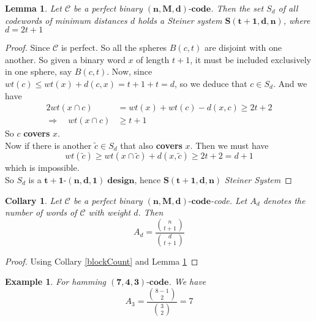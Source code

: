 \documentclass{article}
\newtheorem{lemma}[theorem]{Lemma}
\newtheorem{example}[theorem]{Example}
\newtheorem{collary}[theorem]{Collary}
\numberwithin{equation}{theorem}
\newcommand{\tParamDesign}[4]{\ensuremath{\bm{#1\mbox{-}(#2,#3,#4)\; design}}}
\newcommand{\steinerSystem}[3]{\ensuremath{\bm{S(#1,#2,#3)}}}
\newcommand{\cCodes}{\ensuremath{\mathscr{C}}}
\newcommand{\code}[3]{\ensuremath{\bm{(#1,#2,#3)\mbox{-}code}}}
\newcommand{\linearCode}[3]{\ensuremath{\bm{(#1,#2,#3)\mbox{-}code}}}
\begin{document}
\begin{lemma}\label{perfectCdDesign}
Let {\cCodes} be a perfect binary {\code{n}{M}{d}}. Then the set $S_d$ of all codewords of minimum distances $d$ holds a \emph{Steiner system} \steinerSystem{t+1}{d}{n}, where $d = 2t + 1$
\end{lemma}

\begin{proof}
Since {\cCodes} is perfect. So all the spheres $B(c,t)$ are disjoint with one another. So given a binary word $x$ of length $t+1$, it must be included exclusively in one sphere, say $B(c,t)$. Now, since $wt(c) \leq wt(x) + d(c,x) = t + 1 + t = d$, so we deduce that $c \in S_d$. And we have
\begin{align*}
	2wt(x \cap c) &= wt(x) + wt(c) - d(x,c) \geq 2t+2 \\
	\Rightarrow \quad wt(x\cap c) &\geq t + 1
\end{align*}
So $c$ \textbf{covers} $x$. \\
Now if there is another $\tilde{c} \in S_d$ that also \textbf{covers} $x$. Then we must have 
\[
	wt(\tilde{c}) \geq wt(x\cap \tilde{c}) + d(x,\tilde{c}) \geq 2t + 2 = d + 1
\]
 which is impossible. \\
So $S_d$ is a \tParamDesign{t+1}{n}{d}{1}, hence \steinerSystem{t+1}{d}{n} \emph{Steiner System}
\end{proof}

\begin{collary}\label{perfectCodeAd}
Let {\cCodes} be a perfect binary \code{n}{M}{d}-code. Let $A_d$ denotes the number of words of {\cCodes} with weight $d$. Then
\[
	A_d = \frac{\binom{n}{t+1}}{\binom{d}{t+1}}
\]
\end{collary}
\begin{proof}
	Using Collary \ref{blockCount}  and Lemma \ref{perfectCdDesign}
\end{proof}
\begin{example}
For hamming \linearCode{7}{4}{3}. We have
\[
	A_3 = \frac{\binom{8-1}{2}}{\binom{3}{2}} = 7
\]
\end{example}
\end{document}
